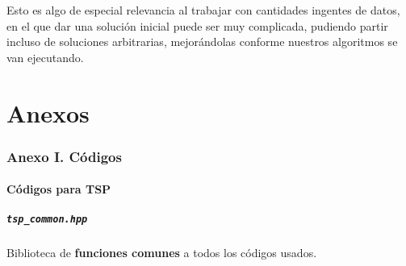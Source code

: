\documentclass[10pt, a4paper]{article}
\theoremstyle{theorem-style}
\theoremstyle{theorem-style}
\theoremstyle{definition-style}
\theoremstyle{remark-style}
\theoremstyle{example-style}
\theoremstyle{definition-style}
\theoremstyle{remark-style}
\begin{document}
Esto es algo de especial relevancia al trabajar con cantidades ingentes de datos, en el que dar una solución inicial puede ser muy complicada, pudiendo partir incluso de soluciones arbitrarias, mejorándolas conforme nuestros algoritmos se van ejecutando.

\pagebreak

\part{Anexos}

\section*{Anexo I. Códigos}

\subsection*{Códigos para TSP}

\subsubsection*{\texttt{tsp\_common.hpp}}

Biblioteca de \textbf{funciones comunes} a todos los códigos usados.
\end{document}
